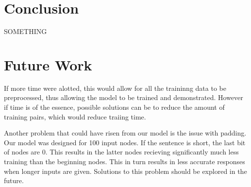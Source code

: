 \documentclass[11pt,twocolumn]{article}
\begin{document}
\section*{Conclusion}
SOMETHING
\section*{Future Work}
If more time were alotted, this would allow for all the traininng data to be preprocessed, thus allowing the model to be trained and demonstrated.  However if time is of the essence, possible solutions can be to reduce the amount of training pairs, which would reduce traiing time.

Another problem that could have risen from our model is the issue with padding.  Our model was designed for 100 input nodes.  If the sentence is short, the last bit of nodes are 0.  This results in the latter nodes recieving significantly much less training than the beginning nodes.  This in turn results in less accurate responses when longer inputs are given.  Solutions to this problem should be explored in the future.




\end{document}
